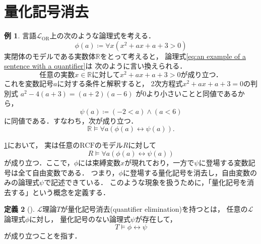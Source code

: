 \documentclass[uplatex, dvipdfmx]{jsarticle}
\numberwithin{equation}{section}
\newcommand{\R}{\mathbb{R}}
\newcommand{\RCF}{\mathrm{RCF}}
\theoremstyle{definition}
\newtheorem{definition}{定義}[section]
\newtheorem{example}[definition]{例}
\begin{document}
\section{量化記号消去}

\begin{example} \label{example:quantifier elimination}
     言語$\mathcal{L}_\mathrm{OR}$上の次のような論理式を考える．
     \begin{equation} \label{eq:an example of a sentence with a quantifier}
          \phi(a) \coloneqq \forall x (x^2 + ax + a + 3 > 0)
     \end{equation}
     実閉体のモデルである実数体$\R$をとって考えると，
     論理式\eqref{eq:an example of a sentence with a quantifier}は
     次のように言い換えられる．
     \begin{equation}
          \text{任意の実数$x \in \R$に対して$x^2 + ax + a + 3 > 0$が成り立つ．}  
     \end{equation}
     これを変数記号$a$に対する条件と解釈すると，
     2次方程式$x^2 + ax + a + 3 = 0$の判別式
     $
     a^2 - 4 (a+3) = (a+2)(a-6)
     $
     が0より小さいことと同値であるから，
     \begin{equation}
          \psi(a) \coloneqq (-2 < a) \land (a < 6)
     \end{equation}
     に同値である．すなわち，次が成り立つ．
     \begin{equation}
          \R \models \forall a (\phi(a) \leftrightarrow \psi(a)).
     \end{equation}
\end{example}

\cref{example:quantifier elimination}において，
実は任意の$\RCF$のモデル$R$に対して
\begin{equation}
     R \models \forall a (\phi(a) \leftrightarrow \psi(a))
\end{equation}
が成り立つ．ここで，$\phi$には束縛変数$x$が現れており，一方で$\psi$に登場する変数記号は全て自由変数である．
つまり，$\phi$に登場する量化記号を消去し，自由変数のみの論理式$\psi$で記述できている．
このような現象を扱うために，「量化記号を消去する」という概念を定義する．


\begin{definition}[{\cite[Definition 3.1.1.]{MR1924282}}]
$\mathcal{L}$理論$T$が量化記号消去(quantifier elimination)を持つとは，
任意の$\mathcal{L}$論理式$\phi$に対し，
量化記号のない論理式$\psi$が存在して，
\begin{equation}
     T \models \phi \leftrightarrow \psi
\end{equation}
が成り立つことを指す．
\end{definition}
\end{document}
